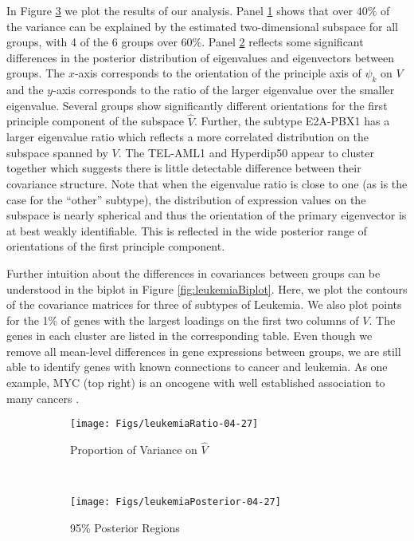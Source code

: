 \documentclass{article}
\begin{document}
In Figure \ref{fig:leukemia} we plot the results of our analysis.
Panel \ref{fig:leukemiaRatio} shows that over $40\%$ of the variance
can be explained by the estimated two-dimensional subspace for all groups, with 4 of
the 6 groups over 60\%.  Panel \ref{fig:leukemiaPosterior} reflects some significant
differences in the posterior distribution of eigenvalues and
eigenvectors between groups.  The $x$-axis corresponds to the
orientation of the principle axis of $\psi_k$ on $V$ and the $y$-axis
corresponds to the ratio of the larger eigenvalue over the smaller
eigenvalue.  Several groups show significantly different orientations
for the first principle component of the subspace $\hat{V}$.  Further,
the subtype E2A-PBX1 has a larger eigenvalue ratio which reflects a
more correlated distribution on the subspace spanned by $V$.  The
TEL-AML1 and Hyperdip50 appear to cluster together which suggests
there is little detectable difference between their covariance
structure.  Note that when the eigenvalue ratio is close to one (as is
the case for the ``other'' subtype), the distribution of expression
values on the subspace is nearly spherical and thus the orientation of
the primary eigenvector is at best weakly identifiable.  This is
reflected in the wide posterior range of orientations of the first
principle component.

Further intuition about the differences in covariances between groups
can be understood in the biplot in Figure
\ref{fig:leukemiaBiplot}.  Here, we plot the contours of the
covariance matrices for three of subtypes of Leukemia.  We also plot
points for the 1\% of genes with the largest loadings on the first two columns
of $V$.  The genes in each cluster are
listed in the corresponding table.  Even though we remove all
mean-level differences in gene expressions between groups, we are
still able to identify genes with known connections to cancer and
leukemia.  As one example, MYC (top right) is an oncogene with well
established association to many cancers \citep{Dang2012}.  

\begin{figure}[t]
    \centering
    \begin{subfigure}[b]{0.45\textwidth}
        \texttt{[image: Figs/leukemiaRatio-04-27]}
        \caption{Proportion of Variance on $\hat{V}$}
        \label{fig:leukemiaRatio}
    \end{subfigure}
    ~ %
    \begin{subfigure}[b]{0.45\textwidth}
        \texttt{[image: Figs/leukemiaPosterior-04-27]}
        \caption{95\% Posterior Regions }
        \label{fig:leukemiaPosterior}
    \end{subfigure}
\caption{}
\label{fig:leukemia}
\end{figure}
\end{document}
